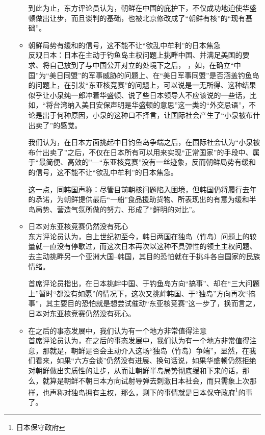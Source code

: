\documentclass[a4paper,11pt]{article}
\begin{document}
\begin{itemize}
\begin{itemize}
    到此为止，东方评论员认为，朝鲜在中国的庇护下，不仅成功地迫使华盛顿做出让步，而且谈判的基础，也被北京修改成了“朝鲜有核”的“现有基础”。
 
 

\item 朝鲜局势有缓和的信号，这不能不让“欲乱中牟利”的日本焦急\\
\label{sec-1_3_10}%
反观日本：日本在主动于钓鱼岛主权问题上挑畔中国、并满足美国的要求、将自己放到了与中国公开对立的处境下之后，
    ，如，在确立“中国”为“美日同盟”的军事威胁的问题上、在“美日军事同盟”是否涵盖钓鱼岛的问题上，在引发“东亚核竞赛”的问题上，可以说是一无所得、这种结果似乎让小泉纯一郎冲着华盛顿、说了些日本领导人不应该说的一些话，比如，“将台湾纳入美日安保声明是华盛顿的意思”这一类的“外交忌语”，不论是出于何种原因，小泉的这种口不择言，让国际社会产生了“小泉被布什出卖了”的感觉。

    我们认为，在日本方面挑起中日钓鱼岛争端之后，在国际社会认为“小泉被布什出卖了”之后，不仅在日本所有可以用来实现“正常国家”的手段中、属于“最简便、高效的”---“东亚核竞赛”没有一丝迹象，反而朝鲜局势有缓和的信号，这不能不让“欲乱中牟利”的日本焦急。

    这一点，同韩国声称：尽管目前朝核问题陷入困境，但韩国仍将履行去年的承诺，为朝鲜提供最后“一船”食品援助货物、所表现出的有意为缓和半岛局势、营造气氛所做的努力、形成了“鲜明的对比”。
 
 

\item 日本对东亚核竞赛仍然没有死心\\
\label{sec-1_3_11}%
东方评论员认为，自上世纪初至今，韩日两国在独岛（竹岛）问题上的较量就一直没有停歇过，而这次日本再次以这种不具弹性的领土主权问题、去主动挑畔另一个亚洲大国--韩国，其目的恐怕就在于挑斗各自国家的民族情绪。

    首席评论员指出，在日本挑衅中国、于钓鱼岛方向“搞事”、却在“三大问题上”暂时“都没有如愿”的情况下，这次又挑衅韩国、于“独岛”方向再次“搞事”，其主要目的恐怕就是想尝试催动“东亚核竞赛”这一步了，换而言之，日本对东亚核竞赛仍然没有死心。
 

\item 在之后的事态发展中，我们认为有一个地方非常值得注意\\
\label{sec-1_3_12}%
首席评论员认为，在之后的事态发展中，我们认为有一个地方非常值得注意，那就是，朝鲜是否会主动介入这场“独岛（竹岛）争端”，显然，在我们看来，如果“六方会谈”仍然没有进展、换句话说，如果华盛顿仍然拒绝对朝鲜做出实质性的让步，从而让朝鲜半岛局势彻底缓和下来的话，那么，就算是朝鲜不朝日本方向试射导弹去刺激日本社会，而只需象上次那样，也声称对独岛拥有主权，那么，剩下的事情就是日本保守政府\footnote{日本保守政府 }的事了。


\end{itemize}
\end{itemize}
\end{document}

